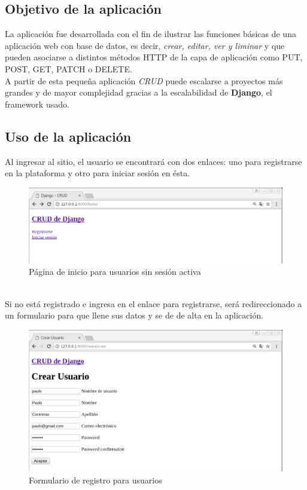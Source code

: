 \documentclass[9pt]{article}
\begin{document}
\subsection*{Objetivo de la aplicación}
La aplicación fue desarrollada con el fin de ilustrar las funciones básicas de una aplicación web con base de datos, es decir, \textit{crear, editar, ver y liminar} y que pueden asociarse a distintos métodos \textsf{HTTP} de la capa de aplicación como \textsf{PUT, POST, GET, PATCH o DELETE}. \\
A partir de esta pequeña aplicación \textit{CRUD} puede escalarse a proyectos más grandes y de mayor complejidad gracias a la escalabilidad de \textbf{Django}, el framework usado.

\subsection*{Uso de la aplicación}
Al ingresar al sitio, el usuario se encontrará con dos enlaces: uno para registrarse en la plataforma y otro para iniciar sesión en ésta.
\begin{figure}[h!]
  \centering
  \includegraphics[width=\textwidth]{django_crud/home_notlogged}
  \caption{Página de inicio para usuarios sin sesión activa}
\end{figure}
\\
Si no está registrado e ingresa en el enlace para registrarse, será redireccionado a un formulario para que llene sus datos y se de de alta en la aplicación. 
\begin{figure}[h!]
  \centering
  \includegraphics[width=\textwidth]{django_crud/registration}
  \caption{Formulario de registro para usuarios}
\end{figure}
\end{document}
